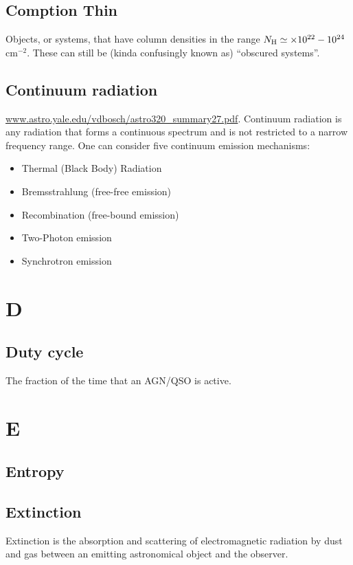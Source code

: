 \documentclass[11pt]{article}
\begin{document}
\subsection*{Comption Thin}
Objects, or systems, that have column densities in the range $N_{\rm H}
\simeq \times 10^{22} - 10^{24}$ cm$^{-2}$. These can still be 
(kinda confusingly known as) ``obscured systems''. 

\subsection*{Continuum radiation}
\href{www.astro.yale.edu/vdbosch/astro320\_summary27.pdf}{www.astro.yale.edu/vdbosch/astro320\_summary27.pdf}.
Continuum radiation is any radiation that forms a continuous spectrum and is not restricted to a narrow frequency range. One can consider five continuum emission mechanisms:
\begin{itemize}
\item Thermal (Black Body) Radiation
\item Bremsstrahlung (free-free emission)
\item Recombination (free-bound emission) 
\item Two-Photon emission
\item Synchrotron emission
\end{itemize}

    

\section*{D}
    \subsection*{Duty cycle}
    The fraction of the time that an AGN/QSO is active.

\section*{E}
    \subsection*{Entropy}

    \subsection*{Extinction}
    Extinction is the absorption and scattering of electromagnetic
radiation by dust and gas between an emitting astronomical object and
the observer.
\end{document}
